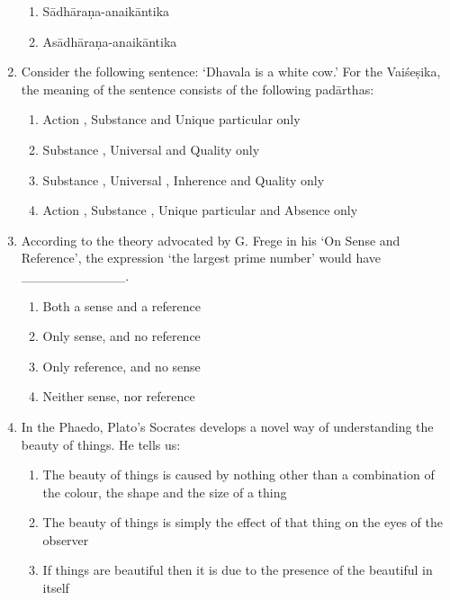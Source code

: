 \documentclass[12pt]{article}
\theoremstyle{remark}
\begin{document}
\begin{enumerate}
\begin{enumerate}
    \item S\={a}dh\={a}ra\d{n}a-anaik\={a}ntika 
    \item As\={a}dh\={a}ra\d{n}a-anaik\={a}ntika 
\end{enumerate}
\hfill{}
\item Consider the following sentence: ‘Dhavala is a white cow.’ For the Vai\'{s}e\d{s}ika, the meaning  of the sentence consists of the following pad\={a}rthas:
\begin{enumerate}
    \item Action , Substance  and Unique particular  only
    \item Substance , Universal  and Quality  only
    \item Substance , Universal , Inherence  and Quality  only
    \item Action , Substance , Unique particular  and Absence  only
\end{enumerate}
\hfill{}
\item According to the theory advocated by G. Frege in his ‘On Sense and Reference’, the expression ‘the largest prime number’ would have \_\_\_\_\_\_\_\_\_\_\_.
\begin{enumerate}
    \item Both a sense and a reference
    \item Only sense, and no reference
    \item Only reference, and no sense
    \item Neither sense, nor reference
\end{enumerate}
\hfill{}
\item In the Phaedo, Plato’s Socrates develops a novel way of understanding the beauty of things. He tells us:
\begin{enumerate}
    \item The beauty of things is caused by nothing other than a combination of the colour, the shape and the size of a thing
    \item The beauty of things is simply the effect of that thing on the eyes of the observer
    \item If things are beautiful then it is due to the presence  of the beautiful in itself

\end{enumerate}
\end{enumerate}
\end{document}
